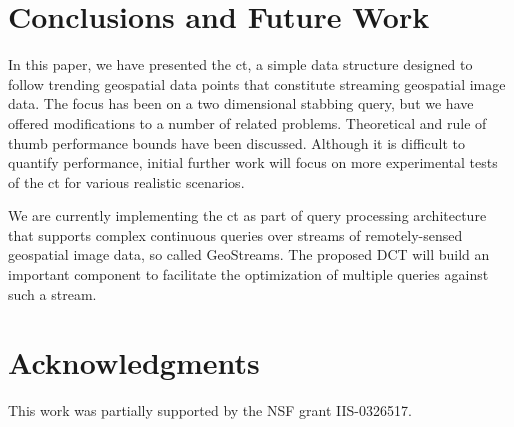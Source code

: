\documentclass{stdbm}
\newcommand{\ct}{\id{DCT}}
\begin{document}

\vspace*{-1ex}
\section{Conclusions and Future Work}
\label{sec:conclusions}

In this paper, we have presented the \acf{ct}, a simple data structure
designed to follow trending geospatial data points that constitute
streaming geospatial image data.  The focus has been on a two
dimensional stabbing query, but we have offered modifications to a
number of related problems.  Theoretical and rule of thumb performance
bounds have been discussed.  Although it is difficult to quantify
performance, initial further work will focus on more experimental
tests of the \ac{ct} for various realistic scenarios.

We are currently implementing the \acf{ct} as part of query processing
architecture that supports complex continuous queries over streams of
remotely-sensed geospatial image data, so called GeoStreams. The
proposed DCT will build an important component to facilitate the
optimization of multiple queries against such a stream.
\vspace*{-1ex}
\section{Acknowledgments}
This work was partially supported by the NSF grant IIS-0326517.

\vspace*{-1ex}


\end{document}

